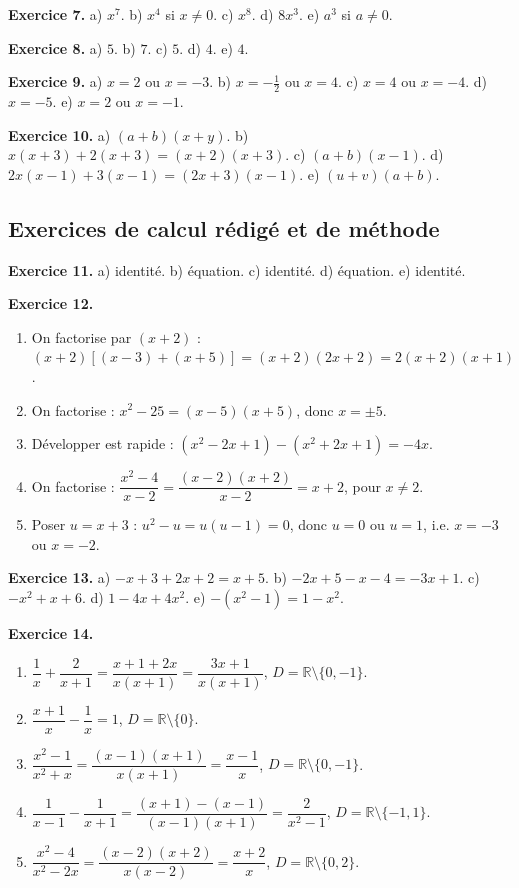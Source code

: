 \documentclass[11pt,a4paper]{article}
\newcommand{\R}{\mathbb R}
\begin{document}
\textbf{Exercice 7.} a) $x^7$. b) $x^4$ si $x\neq 0$. c) $x^8$. d) $8x^3$. e) $a^3$ si $a\neq 0$.

\textbf{Exercice 8.} a) $5$. b) $7$. c) $5$. d) $4$. e) $4$.

\textbf{Exercice 9.} a) $x=2$ ou $x=-3$. b) $x=-\tfrac12$ ou $x=4$. c) $x=4$ ou $x=-4$. d) $x=-5$. e) $x=2$ ou $x=-1$.

\textbf{Exercice 10.} a) $(a+b)(x+y)$. b) $x(x+3)+2(x+3)=(x+2)(x+3)$. c) $(a+b)(x-1)$. d) $2x(x-1)+3(x-1)=(2x+3)(x-1)$. e) $(u+v)(a+b)$.

\subsection*{Exercices de calcul rédigé et de méthode}
\textbf{Exercice 11.} a) identité. b) équation. c) identité. d) équation. e) identité.

\textbf{Exercice 12.}
\begin{enumerate}[label=\alph*)]
\item On factorise par $(x+2)$ : $(x+2)[(x-3)+(x+5)]=(x+2)(2x+2)=2(x+2)(x+1)$.
\item On factorise : $x^2-25=(x-5)(x+5)$, donc $x=\pm 5$.
\item Développer est rapide : $(x^2-2x+1)-(x^2+2x+1)=-4x$.
\item On factorise : $\dfrac{x^2-4}{x-2}=\dfrac{(x-2)(x+2)}{x-2}=x+2$, pour $x\neq 2$.
\item Poser $u=x+3$ : $u^2-u=u(u-1)=0$, donc $u=0$ ou $u=1$, i.e. $x=-3$ ou $x=-2$.
\end{enumerate}

\textbf{Exercice 13.} a) $-x+3+2x+2=x+5$. b) $-2x+5-x-4=-3x+1$. c) $-x^2+x+6$. d) $1-4x+4x^2$. e) $-(x^2-1)=1-x^2$.

\textbf{Exercice 14.}
\begin{enumerate}[label=\alph*)]
\item $\dfrac1x+\dfrac2{x+1}=\dfrac{x+1+2x}{x(x+1)}=\dfrac{3x+1}{x(x+1)}$, $D=\R\setminus\{0,-1\}$.
\item $\dfrac{x+1}{x}-\dfrac1x=1$, $D=\R\setminus\{0\}$.
\item $\dfrac{x^2-1}{x^2+x}=\dfrac{(x-1)(x+1)}{x(x+1)}=\dfrac{x-1}{x}$, $D=\R\setminus\{0,-1\}$.
\item $\dfrac1{x-1}-\dfrac1{x+1}=\dfrac{(x+1)-(x-1)}{(x-1)(x+1)}=\dfrac{2}{x^2-1}$, $D=\R\setminus\{-1,1\}$.
\item $\dfrac{x^2-4}{x^2-2x}=\dfrac{(x-2)(x+2)}{x(x-2)}=\dfrac{x+2}{x}$, $D=\R\setminus\{0,2\}$.
\end{enumerate}
\end{document}
